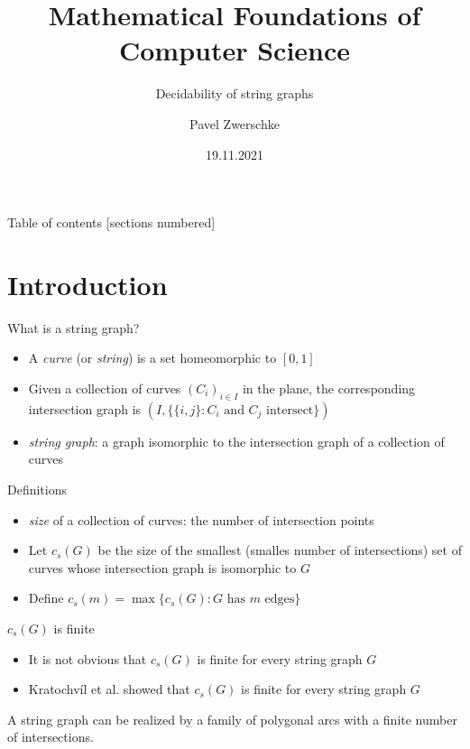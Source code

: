 \documentclass[10pt,aspectratio=169]{beamer}
\title{Mathematical Foundations of Computer Science}
\subtitle{Decidability of string graphs}
\date{19.11.2021}
\author{Pavel Zwerschke}
\institute{Radboud University Nijmegen}
\theoremstyle{plain} %
\theoremstyle{remark} %
\newcommand{\set}[1]{\{#1\}}
\begin{document}
\maketitle

\begin{frame}{Table of contents}
    [sections numbered]
    \tableofcontents%
\end{frame}

\section{Introduction}

\begin{frame}{What is a string graph?}
    \begin{itemize}
        \item A \textit{curve} (or \textit{string}) is a set homeomorphic to \([0,1]\)
        \item Given a collection of curves \((C_i)_{i \in I}\) in the plane, the corresponding intersection graph is \( (I, \set{\set{i, j} : C_i \text{ and } C_j \text{ intersect}}) \)
        \item \textit{string graph}: a graph isomorphic to the intersection graph of a collection of curves 
    \end{itemize}
\end{frame}

\begin{frame}{Definitions}
    \begin{itemize}
        \item \textit{size} of a collection of curves: the number of intersection points
        \item Let \(c_s(G)\) be the size of the smallest (smalles number of intersections) set of curves whose intersection graph is isomorphic to \(G\)
        \item Define \(c_s(m) = \max\set{c_s(G) : G \text{ has } m \text{ edges}}\)
    \end{itemize}
\end{frame}

\begin{frame}{\(c_s(G)\) is finite}
    \begin{itemize}
        \item It is not obvious that \(c_s(G)\) is finite for every string graph \(G\)
        \item Kratochvíl et al. showed that \(c_s(G)\) is finite for every string graph \(G\)
    \end{itemize}
    \begin{lemma}
        A string graph can be realized by a family of polygonal arcs with a finite number of intersections.
    \end{lemma}
\end{frame}
\end{document}
